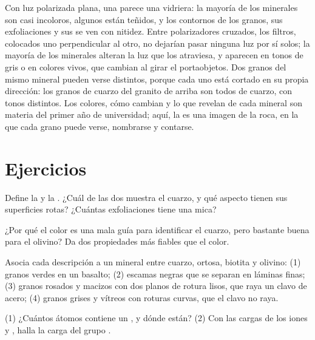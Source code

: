 Con luz polarizada plana, una  parece una vidriera: la mayoría
de los minerales son casi incoloros, algunos están teñidos, y los contornos de
los granos, sus exfoliaciones y sus  se ven con nitidez. Entre
polarizadores cruzados, los filtros, colocados uno perpendicular al otro, no
dejarían pasar ninguna luz por sí solos; la mayoría de los minerales alteran
la luz que los atraviesa, y aparecen en tonos de gris o en colores vivos, que
cambian al girar el portaobjetos. Dos granos del mismo mineral pueden verse
distintos, porque cada uno está cortado en su propia dirección: los granos de
cuarzo del granito de arriba son todos de cuarzo, con tonos distintos. Los
colores, cómo cambian y lo que revelan de cada mineral son materia del primer
año de universidad; aquí, la  es una imagen de la roca, en la
que cada grano puede verse, nombrarse y contarse.

\section{Ejercicios}

\begin{exercise}[$\star$]\label{exo:g11:minerals:1}
Define la  y la . ¿Cuál de las dos muestra el cuarzo, y qué
aspecto tienen sus superficies rotas? ¿Cuántas exfoliaciones tiene una mica?
\end{exercise}

\begin{exercise}[$\star$]\label{exo:g11:minerals:2}
¿Por qué el color es una mala guía para identificar el cuarzo, pero bastante
buena para el olivino? Da dos propiedades más fiables que el color.
\end{exercise}

\begin{exercise}[$\star$]\label{exo:g11:minerals:3}
Asocia cada descripción a un mineral entre cuarzo, ortosa, biotita y olivino:
(1) granos verdes en un basalto; (2) escamas negras que se separan en láminas
finas; (3) granos rosados y macizos con dos planos de rotura lisos, que raya un
clavo de acero; (4) granos grises y vítreos con roturas curvas, que el clavo
no raya.
\end{exercise}

\begin{exercise}[$\star$]\label{exo:g11:minerals:4}
(1) ¿Cuántos átomos contiene un , y dónde están?
(2) Con las cargas de los iones  y , halla la carga del
grupo .
\end{exercise}

